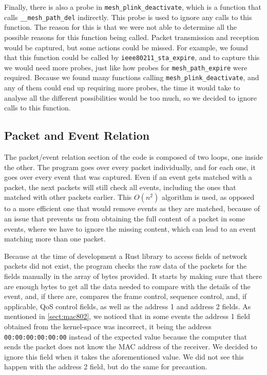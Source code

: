 Finally, there is also a probe in \texttt{mesh\_plink\_deactivate}, which is a
function that calls \texttt{\_\_mesh\_path\_del} indirectly. This probe is used
to ignore any calls to this function. The reason for this is that we were not
able to determine all the possible reasons for this function being called.
Packet transmission and reception would be captured, but some actions could be
missed. For example, we found that this function could be called by
\texttt{ieee80211\_sta\_expire}, and to capture this we would need more probes,
just like how probes for \texttt{mesh\_path\_expire} were required. Because we
found many functions calling \texttt{mesh\_plink\_deactivate}, and any of them
could end up requiring more probes, the time it would take to analyse all the
different possibilities would be too much, so we decided to ignore calls to this
function.


\subsection{Packet and Event Relation}\label{subsec:relate}

The packet/event relation section of the code is composed of two loops, one
inside the other. The program goes over every packet individually, and for each
one, it goes over every event that was captured. Even if an event gets matched
with a packet, the next packets will still check all events, including the ones
that matched with other packets earlier. This $O(n^2)$ algorithm is used, as
opposed to a more efficient one that would remove events as they are matched,
because of an issue that prevents us from obtaining the full content of a packet
in some events, where we have to ignore the missing content, which can lead to
an event matching more than one packet.

Because at the time of development a Rust library to access fields of network
packets did not exist, the program checks the raw data of the packets for the
fields manually in the array of bytes provided. It starts by making sure that
there are enough bytes to get all the data needed to compare with the details of
the event, and, if there are, compares the frame control, sequence control, and,
if applicable, \ac{QoS} control fields, as well as the address 1 and address 2
fields. As mentioned in \autoref{sect:mac802}, we noticed that in some events
the address 1 field obtained from the kernel-space was incorrect, it being the
address \texttt{00:00:00:00:00:00} instead of the expected value because the
computer that sends the packet does not know the \ac{MAC} address of the
receiver. We decided to ignore this field when it takes the aforementioned
value. We did not see this happen with the address 2 field, but do the same for
precaution.


